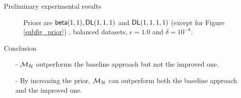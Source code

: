 \documentclass[final,hyperref={pdfpagelabels=false}]{beamer}
\begin{document}
\begin{frame}[t]
\begin{columns}[t]
\begin{column}{.485\textwidth}
\begin{block}{Preliminary experimental results}
\begin{figure}[H]
\begin{center}
  \caption{Priors are $\mathsf{beta}(1,1), \mathsf{DL}(1,1,1)$ and $\mathsf{DL}(1,1,1,1)$ (except for Figure \ref{subfig_prior}) ,
    balanced datasets, $\epsilon = 1.0$ and $\delta = 10^{-8}$. }
\label{fig_sampling}
\end{center}


\end{figure}


\end{block}




\begin{block}{Conclusion}

\begin{itemize}
  \item[-]  $\mathcal{M}_{\mathcal{H}}$ outperforms the baseline approach but not the improved one.
  \item[-] By increasing the prior, $\mathcal{M}_{\mathcal{H}}$ can outperform both the baseline approach and the improved one.
    


\end{itemize}
\end{block}
\end{column}
\end{columns}
\end{frame}
\end{document}
